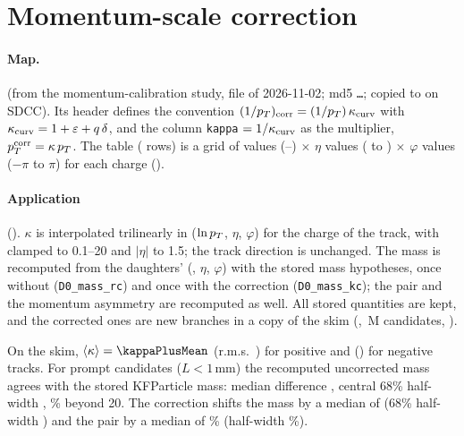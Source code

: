 \section{Momentum-scale correction}
\label{sec:kappa}

\paragraph{Map.}  (from the momentum-calibration
study, file of 2026-11-02; md5 \texttt{\mapMdfive\ldots}; copied to  on
SDCC). Its header defines the convention $(1/p_T)_{\rm corr}=(1/p_T)\,\kappa_{\rm curv}$ with
$\kappa_{\rm curv}=1+\varepsilon+q\,\delta$, and the column \texttt{kappa} $=1/\kappa_{\rm curv}$ as the \pt{} multiplier,
$p_T^{\rm corr}=\kappa\,p_T$. The table (\mapRows{} rows) is a grid of \mapPtN{} \pt{} values (\mapPtMin--\mapPtMax\gevc) $\times$ \mapEtaN{} $\eta$
values (\mapEtaMin{} to \mapEtaMax) $\times$ \mapPhiN{} $\varphi$ values ($-\pi$ to $\pi$) for each charge
().

\paragraph{Application} (). $\kappa$ is interpolated trilinearly in
($\ln p_T$, $\eta$, $\varphi$) for the charge of the track, with \pt{} clamped to 0.1--20\gevc{} and $|\eta|$ to 1.5;
the track direction is unchanged. The \Dzero{} mass is recomputed from the daughters' (\pt, $\eta$, $\varphi$) with the
stored mass hypotheses, once without (\texttt{D0\_mass\_rc}) and once with the correction (\texttt{D0\_mass\_kc}); the
pair \pt{} and the momentum asymmetry are recomputed as well. All stored quantities are kept, and the corrected ones are
new branches in a copy of the skim (, \kcN\,M candidates, \chkKcSameN).

On the skim, $\langle\kappa\rangle=\kappaPlusMean$ (r.m.s.\ \kappaPlusRms) for positive and \kappaMinusMean{}
(\kappaMinusRms) for negative tracks. For prompt candidates ($L<1$\,mm) the recomputed uncorrected mass agrees with the
stored KFParticle mass: median difference \dmRcMed\mev, central 68\% half-width \dmRcHw\mev, \dmRcTail\% beyond 20\mev.
The correction shifts the \Dzero{} mass by a median of \dmKcMed\mev{} (68\% half-width \dmKcHw\mev) and the pair \pt{} by
a median of \ptRelMed\% (half-width \ptRelHw\%).

